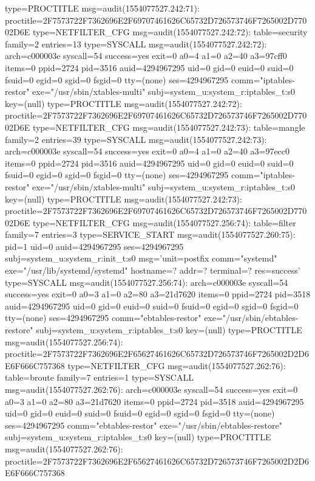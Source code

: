 \documentclass[]{report}
\newenvironment{Shaded}{}{}
\newcommand{\NormalTok}[1]{#1}
\begin{document}
\begin{Shaded}
\begin{Highlighting}[]
\NormalTok{type=PROCTITLE msg=audit(1554077527.242:71): proctitle=2F7573722F7362696E2F69707461626C65732D726573746F7265002D77002D6E}
\NormalTok{type=NETFILTER_CFG msg=audit(1554077527.242:72): table=security family=2 entries=13}
\NormalTok{type=SYSCALL msg=audit(1554077527.242:72): arch=c000003e syscall=54 success=yes exit=0 a0=4 a1=0 a2=40 a3=97cff0 items=0 ppid=2724 pid=3516 auid=4294967295 uid=0 gid=0 euid=0 suid=0 fsuid=0 egid=0 sgid=0 fsgid=0 tty=(none) ses=4294967295 comm="iptables-restor" exe="/usr/sbin/xtables-multi" subj=system_u:system_r:iptables_t:s0 key=(null)}
\NormalTok{type=PROCTITLE msg=audit(1554077527.242:72): proctitle=2F7573722F7362696E2F69707461626C65732D726573746F7265002D77002D6E}
\NormalTok{type=NETFILTER_CFG msg=audit(1554077527.242:73): table=mangle family=2 entries=39}
\NormalTok{type=SYSCALL msg=audit(1554077527.242:73): arch=c000003e syscall=54 success=yes exit=0 a0=4 a1=0 a2=40 a3=97ecc0 items=0 ppid=2724 pid=3516 auid=4294967295 uid=0 gid=0 euid=0 suid=0 fsuid=0 egid=0 sgid=0 fsgid=0 tty=(none) ses=4294967295 comm="iptables-restor" exe="/usr/sbin/xtables-multi" subj=system_u:system_r:iptables_t:s0 key=(null)}
\NormalTok{type=PROCTITLE msg=audit(1554077527.242:73): proctitle=2F7573722F7362696E2F69707461626C65732D726573746F7265002D77002D6E}
\NormalTok{type=NETFILTER_CFG msg=audit(1554077527.256:74): table=filter family=7 entries=3}
\NormalTok{type=SERVICE_START msg=audit(1554077527.260:75): pid=1 uid=0 auid=4294967295 ses=4294967295 subj=system_u:system_r:init_t:s0 msg='unit=postfix comm="systemd" exe="/usr/lib/systemd/systemd" hostname=? addr=? terminal=? res=success'}
\NormalTok{type=SYSCALL msg=audit(1554077527.256:74): arch=c000003e syscall=54 success=yes exit=0 a0=3 a1=0 a2=80 a3=21d7620 items=0 ppid=2724 pid=3518 auid=4294967295 uid=0 gid=0 euid=0 suid=0 fsuid=0 egid=0 sgid=0 fsgid=0 tty=(none) ses=4294967295 comm="ebtables-restor" exe="/usr/sbin/ebtables-restore" subj=system_u:system_r:iptables_t:s0 key=(null)}
\NormalTok{type=PROCTITLE msg=audit(1554077527.256:74): proctitle=2F7573722F7362696E2F65627461626C65732D726573746F7265002D2D6E6F666C757368}
\NormalTok{type=NETFILTER_CFG msg=audit(1554077527.262:76): table=broute family=7 entries=1}
\NormalTok{type=SYSCALL msg=audit(1554077527.262:76): arch=c000003e syscall=54 success=yes exit=0 a0=3 a1=0 a2=80 a3=21d7620 items=0 ppid=2724 pid=3518 auid=4294967295 uid=0 gid=0 euid=0 suid=0 fsuid=0 egid=0 sgid=0 fsgid=0 tty=(none) ses=4294967295 comm="ebtables-restor" exe="/usr/sbin/ebtables-restore" subj=system_u:system_r:iptables_t:s0 key=(null)}
\NormalTok{type=PROCTITLE msg=audit(1554077527.262:76): proctitle=2F7573722F7362696E2F65627461626C65732D726573746F7265002D2D6E6F666C757368}

\end{Highlighting}
\end{Shaded}
\end{document}
